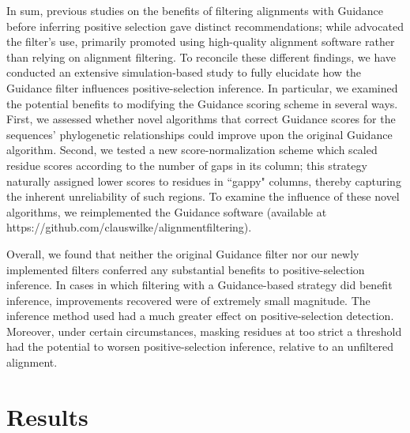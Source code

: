 \documentclass[11pt]{article}
\begin{document}
In sum, previous studies on the benefits of filtering alignments with Guidance before inferring positive selection gave distinct recommendations; while \citet{Privman2012} advocated the filter's use, \citet{Jordan2012} primarily promoted using high-quality alignment software rather than relying on alignment filtering. To reconcile these different findings, we have conducted an extensive simulation-based study to fully elucidate how the Guidance filter influences positive-selection inference. In particular, we examined the potential benefits to modifying the Guidance scoring scheme in several ways. First, we assessed whether novel algorithms that correct Guidance scores for the sequences' phylogenetic relationships could improve upon the original Guidance algorithm. Second, we tested a new score-normalization scheme which scaled residue scores according to the number of gaps in its column; this strategy naturally assigned lower scores to residues in ``gappy" columns, thereby capturing the inherent unreliability of  such regions. To examine the influence of these novel algorithms, we reimplemented the Guidance software (available at https://github.com/clauswilke/alignment\underline{\hspace*{0.2cm}}filtering).

Overall, we found that neither the original Guidance filter nor our newly implemented filters conferred any substantial benefits to positive-selection inference. In cases in which filtering with a Guidance-based strategy did benefit inference, improvements recovered were of extremely small magnitude. The inference method used had a much greater effect on positive-selection detection. Moreover, under certain circumstances, masking residues at too strict a threshold had the potential to worsen positive-selection inference, relative to an unfiltered alignment.

\section*{Results}
\end{document}
